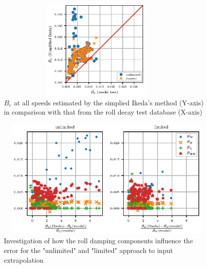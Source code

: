 \begin{figure}[H]
\vspace{-0.5cm}
\centering
  \centering
  \includegraphics[height=5cm, width = 10cm]{figures/ikeda_limited.eps}
  \vspace{-0.5cm}
  \caption{$\hat{B_e}$ at all speeds estimated by the simplied Ikeda's method (Y-axis) in comparison with that from the roll decay test database (X-axis)}
  \label{fig:ikeda_limited}
\end{figure}


\begin{figure}[H]
\vspace{-0.5cm}
\centering
  \centering
  \includegraphics[height=6cm, width = 14cm]{figures/ikeda_components.eps}
  \vspace{-0.5cm}
  \caption{Investigation of how the roll damping components influence the error for the "unlimited" and "limited" approach to input extrapolation}
  \label{fig:ikeda_components}
\end{figure}


